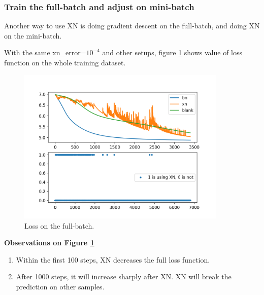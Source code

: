 \subsubsection{Train the full-batch and adjust on mini-batch}
Another way to use XN is doing gradient descent on the full-batch, and doing XN on the mini-batch.

With the same xn\_error=$10^{-4}$ and other setups, figure \ref{fig:XN_points_full} shows value of loss function on the whole training dataset.
\begin{figure}[H]
	\center
	\includegraphics*[width=10cm]{./figures/XN5.png}
	\caption{Loss on the full-batch.}
	\label{fig:XN_points_full}
\end{figure}
\textbf{Observations on Figure \ref{fig:XN_points_full}} 
\begin{enumerate}
	\item Within the first 100 steps, XN decreases the full loss function.
	\item After 1000 steps, it will increase sharply after XN. XN will break the prediction on other samples.
\end{enumerate}

